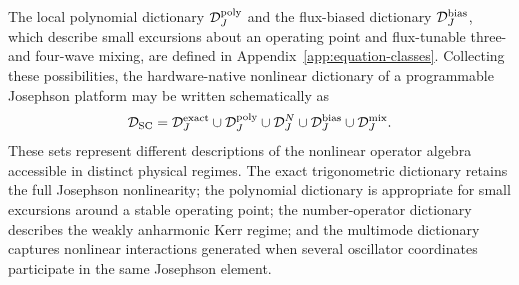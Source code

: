 \documentclass[pra,twocolumn,superscriptaddress,nofootinbib,floatfix]{revtex4-2}
\theoremstyle{remark}
\begin{document}
The local polynomial dictionary \(\mathcal D_J^{\rm poly}\) and the flux-biased dictionary \(\mathcal D_J^{\rm bias}\), which describe small excursions about an operating point and flux-tunable three- and four-wave mixing, are defined in Appendix~\ref{app:equation-classes}.
Collecting these possibilities, the hardware-native nonlinear dictionary of a programmable Josephson platform may be written schematically as
\begin{align}
\mathcal D_{\rm SC}=\mathcal D_{J}^{\rm exact}\cup\mathcal D_{J}^{\rm poly}\cup\mathcal D_{J}^{N}\cup\mathcal D_{J}^{\rm bias}\cup\mathcal D_{J}^{\rm mix}.
\label{eq:complete-superconducting-dictionary}
\end{align}
These sets represent different descriptions of the nonlinear operator algebra accessible in distinct physical regimes. The exact trigonometric dictionary retains the full Josephson nonlinearity; the polynomial dictionary is appropriate for small excursions around a stable operating point; the number-operator dictionary describes the weakly anharmonic Kerr regime; and the multimode dictionary captures nonlinear interactions generated when several oscillator coordinates participate in the same Josephson element.
\end{document}
